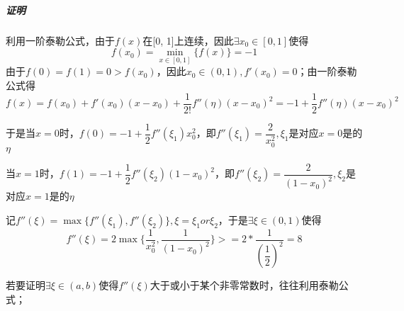 \subparagraph{证明}
利用一阶泰勒公式，由于\(f(x)\)在[0, 1]上连续，因此\(\exists x_0 \in [0, 1]\)使得\[f(x_0) = \displaystyle\min_{x \in [0, 1]}\{f(x)\} = -1\]
由于\(f(0) = f(1) = 0 > f(x_0)\)，因此\(x_0 \in (0, 1), f'(x_0) = 0\)；由一阶泰勒公式得\[f(x) = f(x_0) + f'(x_0)(x - x_0) + \dfrac{1}{2!}f''(\eta)(x - x_0)^2 = -1 + \dfrac{1}{2}f''(\eta)(x - x_0)^2\]

于是当\(x = 0\)时，\(f(0) = -1 + \dfrac{1}{2}f''(\xi_1)x_0^2\)，即\(f''(\xi_1) = \dfrac{2}{x_0^2}, \xi_1\)是对应\(x = 0\)是的\(\eta\)

当\(x = 1\)时，\(f(1) = -1 + \dfrac{1}{2}f''(\xi_2)(1 - x_0)^2\)，即\(f''(\xi_2) = \dfrac{2}{(1 - x_0)^2}, \xi_2\)是对应\(x = 1\)是的\(\eta\)

记\(f''(\xi) = \max\{f''(\xi_1), f''(\xi_2)\}, \xi = \xi_1 or \xi_2\)，于是\(\exists \xi \in (0, 1)\)使得\[f''(\xi) = 2\max\{\dfrac{1}{x_0^2}, \dfrac{1}{(1 - x_0)^2}\} >= 2 * \dfrac{1}{(\dfrac{1}{2})^2} = 8\]

若要证明\(\exists \xi \in (a, b)\)使得\(f''(\xi)\)大于或小于某个非零常数时，往往利用泰勒公式；












